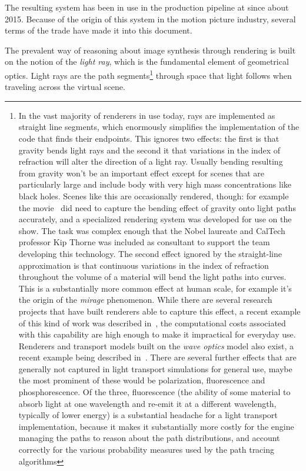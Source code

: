 The resulting system has been in use in the
production pipeline at  since about 2015.
Because of the origin of this system in the motion picture industry,
several terms of the trade have made it into this document. 


The prevalent way of reasoning about image synthesis through rendering is 
built on the notion of the \textsl{light ray}, which is the fundamental element 
of geometrical optics. 
Light rays are the path segments\footnote{
	In the vast majority of renderers in use today, rays are implemented as 
	straight line segments, which enormously simplifies the implementation of the
	code that finds their endpoints. This ignores two effects: the first is that 
	gravity bends light rays and the second it that variations in the index
	of refraction will alter the direction of a light ray.
	Usually bending resulting from gravity won't be an important effect except 
	for scenes that are particularly large and include body with very high mass 
	concentrations like black holes.
	Scenes like this are occasionally rendered, though: for example the 
	movie~\cite{interstellar2014} did need to capture the bending effect of 
	gravity onto light paths accurately, and a specialized rendering system 
	was developed for use on the show. 
	The task was complex enough that the Nobel laureate and CalTech professor 
	Kip Thorne was included as consultant to support the team developing this 
	technology. 
	The second effect ignored by the straight-line approximation is that 
	continuous variations in the index of refraction throughout the volume of a material 
	will bend the light paths into curves. 
	This is a substantially more common effect at human scale, for example 
	it's the origin of the \textsl{mirage} phenomenon. 
	While there are several research projects that have built renderers able 
	to capture this effect, a recent example
	of this kind of work was described in~\cite{fraboni23}, 
	the computational costs associated with this capability 
	are high enough to make it impractical for everyday use.
	Renderers and transport models built on the \emph{wave optics} model also exist,
	a recent example being described in~\cite{yu23}.
	There are several further effects that are generally not captured in 
	light transport simulations for general use, maybe the most prominent of these would be
	polarization, fluorescence and phosphorescence. Of the three, fluorescence
	(the ability of some material to absorb light at one wavelength and re-emit it
	at a different wavelength, typically of lower energy) is a substantial headache for
	a light transport implementation, because it makes it substantially more costly for the 
	engine managing the paths to reason about the path distributions, and account correctly
	for the various probability measures used by the path tracing algorithms
} through space that light follows when traveling across the \gls{virtual scene}. 

